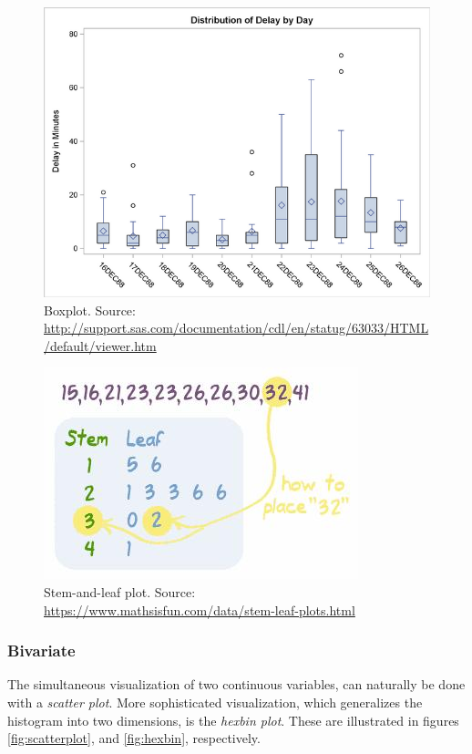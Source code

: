 \documentclass[12pt,a4paper]{report}
\begin{document}
\begin{figure}[h]
\centering
\includegraphics[height=0.3\textheight]{art/ex6aout}
\caption[BoxPlot]{Boxplot. Source: \url{http://support.sas.com/documentation/cdl/en/statug/63033/HTML/default/viewer.htm}}
\label{fig:boxplot}
\end{figure}



\begin{figure}[h]
\centering
\includegraphics[height=0.3\textheight]{art/stem_and_leaf}
\caption[Stem and Leaf Pot]{Stem-and-leaf plot. Source: \url{https://www.mathsisfun.com/data/stem-leaf-plots.html}}
\label{fig:stem_and_leaf}
\end{figure}




\subsubsection{Bivariate}
The simultaneous visualization of two continuous variables, can naturally be done with a \emph{scatter plot}.
More sophisticated visualization, which generalizes the histogram into two dimensions, is the \emph{hexbin plot}.  
These are illustrated in figures \ref{fig:scatterplot}, and \ref{fig:hexbin}, respectively. 
\end{document}
